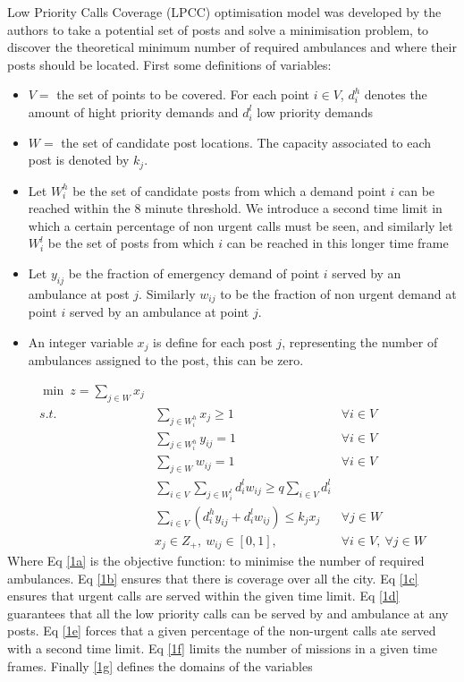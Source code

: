 \documentclass[11pt]{article} %
\begin{document}
Low Priority Calls Coverage (LPCC) optimisation model was developed by the authors to take a potential set of posts and solve a minimisation problem, to discover the theoretical minimum number of required ambulances and where their posts should be located. First some definitions of variables:
\begin{itemize}
	\item $V=$ the set of points to be covered. For each point $ i \in V $, $d_i^h$ denotes the amount of hight priority demands and $d_i^l$ low priority demands 
	\item $ W= $ the set of candidate post locations. The capacity associated to each post is denoted by $ k_j $.
	\item Let $ W_i^h $ be the set of candidate posts from which a demand point $ i $ can be reached within the 8 minute threshold. 
	We introduce a second time limit in which a certain percentage of non urgent calls must be seen, and similarly let $ W_i^l $ be the set of posts from which $ i $ can be reached in this longer time frame
	\item Let $ y_{ij} $ be the fraction of emergency demand of point $ i  $ served by an ambulance at post $ j $. Similarly $ w_{ij} $ to be the fraction of non urgent demand at point $ i  $ served by an ambulance at point $ j $.
	\item An integer variable $ x_j $ is define for each post $ j $, representing the number of ambulances assigned to the post, this can be zero.
\end{itemize}

\begin{eqnarray}
\min \ z=\sum_{j\in W} x_j \label{1a}\\
s.t.\ &\sum_{j\in W_i^h} x_j\geq1\ \ &\forall i \in V\label{1b}\\
&\sum_{j\in W_i^h} y_{ij}=1\ \ &\forall i \in V\label{1c}\\
&\sum_{j\in W}w_{ij}=1 \ \ & \forall i\in V \label{1d}\\
&\sum_{i \in V} \sum_{j \in W_i^l} d_i^l w_{ij} \geq q \sum_{i \in V} d_i^l\label{1e}\\
&\sum_{i \in V} (d_i^h y_{ij} +d_i^l w_{ij}) \leq k_jx_j & \forall j \in W\label{1f}\\
&x_j\in Z_+, \ w_{ij} \in [0,1], \ &\forall i \in V,\  \forall j \in W \label{1g}
\end{eqnarray}
Where Eq \ref{1a} is the objective function: to minimise the number of required ambulances. Eq \ref{1b} ensures that there is coverage over all the city. Eq \ref{1c} ensures that urgent calls are served within the given time limit. Eq \ref{1d} guarantees that all the low priority calls can be served by and ambulance at any posts. Eq \ref{1e} forces that a given percentage of the non-urgent calls ate served with a second time limit. Eq \ref{1f} limits the number of missions in a given time frames. Finally \ref{1g} defines the domains of the variables 
 
\end{document}
